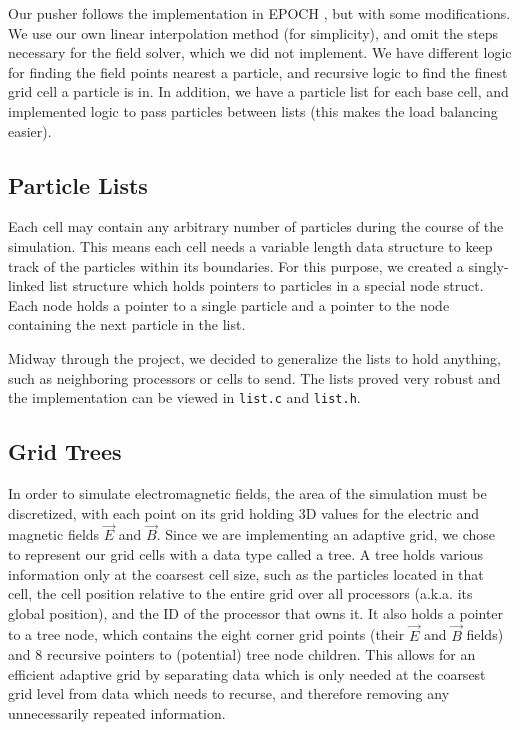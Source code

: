 \documentclass[]{article}
\begin{document}
Our pusher follows the implementation in EPOCH \cite{epoch}, but with some modifications.  We use our own linear interpolation method (for simplicity), and omit the steps necessary for the field solver, which we did not implement.  We have different logic for finding the field points nearest a particle, and recursive logic to find the finest grid cell a particle is in.  In addition, we have a particle list for each base cell, and implemented logic to pass particles between lists (this makes the load balancing easier).

\subsection{Particle Lists}
Each cell may contain any arbitrary number of particles during the course of the simulation. This means each cell needs a variable length data structure to keep track of the particles within its boundaries. For this purpose, we created a singly-linked list structure which holds pointers to particles in a special node struct. Each node holds a pointer to a single particle and a pointer to the node containing the next particle in the list.

Midway through the project, we decided to generalize the lists to hold anything, such as neighboring processors or cells to send.  The lists proved very robust and the implementation can be viewed in \texttt{list.c} and \texttt{list.h}. %

\subsection{Grid Trees}
In order to simulate electromagnetic fields, the area of the simulation must be discretized, with each point on its grid holding 3D values for the electric and magnetic fields $\vec{E}$ and $\vec{B}$. Since we are implementing an adaptive grid, we chose to represent our grid cells with a data type called a tree. A tree holds various information only at the coarsest cell size, such as the particles located in that cell, the cell position relative to the entire grid over all processors (a.k.a. its global position), and the ID of the processor that owns it. It also holds a pointer to a tree node, which contains the eight corner grid points (their $\vec{E}$ and $\vec{B}$ fields) and 8 recursive pointers to (potential) tree node children. This allows for an efficient adaptive grid by separating data which is only needed at the coarsest grid level from data which needs to recurse, and therefore removing any unnecessarily repeated information.
\end{document}
